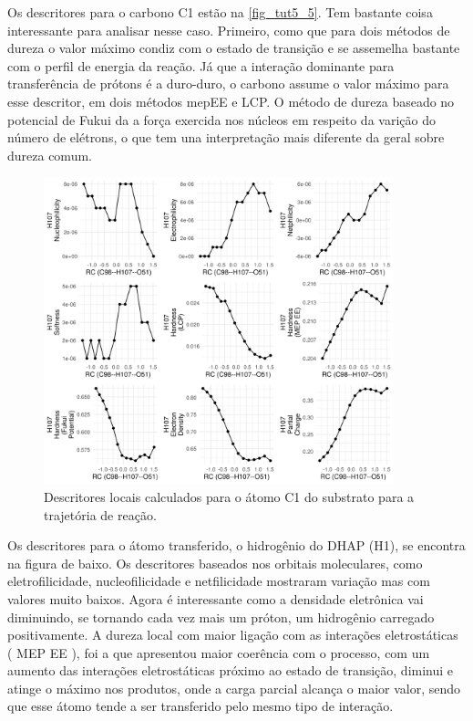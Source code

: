 \documentclass[a4paper,11pt]{refart}
\begin{document}
Os descritores para o carbono C1 estão na \autoref{fig_tut5_5}. Tem bastante coisa interessante para analisar nesse caso. Primeiro, como que para dois métodos de dureza o valor máximo condiz com o estado de transição e se assemelha bastante com o perfil de energia da reação. Já que a interação dominante para transferência de prótons é a duro-duro, o carbono assume o valor máximo para esse descritor, em dois métodos mepEE e LCP. O método de dureza baseado no potencial de Fukui da a força exercida nos núcleos em respeito da varição do número de elétrons, o que tem una interpretação mais diferente da geral sobre dureza comum. 

\hspace*{-\leftmarginwidth}
\begin{minipage}{\fullwidth}
	\begin{figure}[H]
		\begin{center}
			\includegraphics[width=4in]{images/tut6_img5}
			\caption{Descritores locais calculados para o átomo C1 do substrato para a trajetória de reação.}
			\label{fig_tut5_5}
		\end{center}
	\end{figure}
\end{minipage}

Os descritores para o átomo transferido, o hidrogênio do DHAP (H1), se encontra na figura de baixo. Os descritores baseados nos orbitais moleculares, como eletrofilicidade, nucleofilicidade e netfilicidade mostraram variação mas com valores muito baixos. Agora é interessante como a densidade eletrônica vai diminuindo, se tornando cada vez mais um próton, um hidrogênio carregado positivamente. A dureza local com maior ligação com as interações eletrostáticas ( MEP EE ), foi a que apresentou maior coerência com o processo, com um aumento das interações eletrostáticas próximo ao estado de transição, diminui e atinge o máximo nos produtos, onde a carga parcial alcança o maior valor, sendo que esse átomo tende a ser transferido pelo mesmo tipo de interação.
\end{document}
